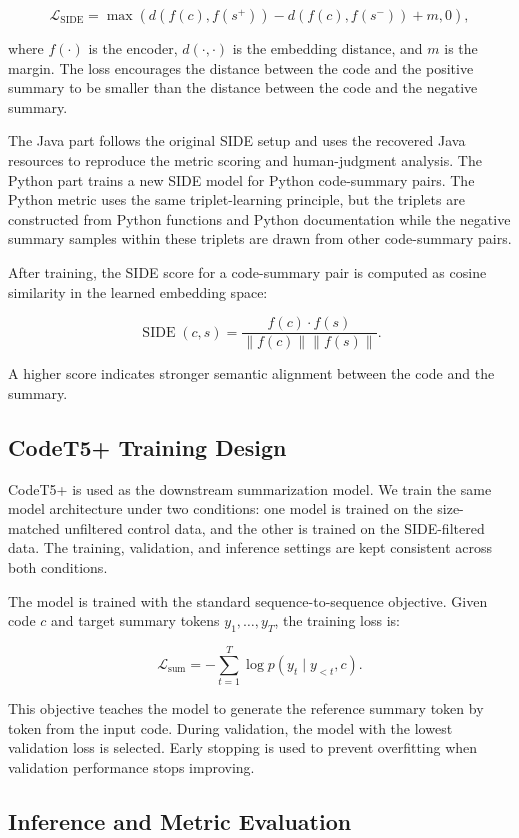 \[
\mathcal{L}_{\text{SIDE}}
=
\max\left(
d(f(c), f(s^{+}))
-
d(f(c), f(s^{-}))
+
m,
0
\right),
\]

where \(f(\cdot)\) is the encoder, \(d(\cdot,\cdot)\) is the embedding distance, and \(m\) is the margin. The loss encourages the distance between the code and the positive summary to be smaller than the distance between the code and the negative summary.

The Java part follows the original SIDE setup and uses the recovered Java resources to reproduce the metric scoring and human-judgment analysis. The Python part trains a new SIDE model for Python code-summary pairs. The Python metric uses the same triplet-learning principle, but the triplets are constructed from Python functions and Python documentation while the negative summary samples within these triplets are drawn from other code-summary pairs.

After training, the SIDE score for a code-summary pair is computed as cosine similarity in the learned embedding space:

\[
\operatorname{SIDE}(c,s)
=
\frac{f(c) \cdot f(s)}
{\|f(c)\| \|f(s)\|}.
\]

A higher score indicates stronger semantic alignment between the code and the summary.

\subsection{CodeT5+ Training Design}

CodeT5+ is used as the downstream summarization model. We train the same model architecture under two conditions: one model is trained on the size-matched unfiltered control data, and the other is trained on the SIDE-filtered data. The training, validation, and inference settings are kept consistent across both conditions.

The model is trained with the standard sequence-to-sequence objective. Given code \(c\) and target summary tokens \(y_1,\ldots,y_T\), the training loss is:

\[
\mathcal{L}_{\text{sum}}
=
-\sum_{t=1}^{T}
\log p(y_t \mid y_{<t}, c).
\]

This objective teaches the model to generate the reference summary token by token from the input code. During validation, the model with the lowest validation loss is selected. Early stopping is used to prevent overfitting when validation performance stops improving.

\subsection{Inference and Metric Evaluation}


